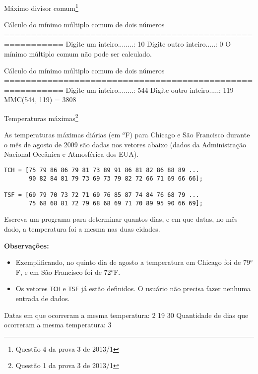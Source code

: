 \documentclass[11pt]{practice}
\begin{document}
\begin{task}[breakable]{Máximo divisor comum\footnote{Questão 4 da prova 3 de 2013/1}}{}
  \begin{runexample}
Cálculo do mínimo múltiplo comum de dois números
=========================================================
Digite um inteiro........: 10
Digite outro inteiro.....: 0
O mínimo múltiplo comum não pode ser calculado.
  \end{runexample}

  \begin{runexample}
Cálculo do mínimo múltiplo comum de dois números
=========================================================
Digite um inteiro........: 544
Digite outro inteiro.....: 119
MMC(544, 119) = 3808
  \end{runexample}

  \tcblower
  \solution
\end{task}


\begin{task}[breakable]{Temperaturas máximas\footnote{Questão 1 da prova 3 de 2013/1}}{}

  As temperaturas máximas diárias (em $^o$F) para Chicago e São
  Francisco durante o mês de agosto de 2009 são dadas nos vetores abaixo
  (dados da Administração Nacional Oceânica e Atmosférica dos EUA).

  \begin{verbatim}
TCH = [75 79 86 86 79 81 73 89 91 86 81 82 86 88 89 ...
       90 82 84 81 79 73 69 73 79 82 72 66 71 69 66 66];

TSF = [69 79 70 73 72 71 69 76 85 87 74 84 76 68 79 ...
       75 68 68 81 72 79 68 68 69 71 70 89 95 90 66 69];
  \end{verbatim}

  Escreva um programa para determinar quantos dias, e em que datas, no
  mês dado, a temperatura foi a mesma nas duas cidades.

  \textbf{Observações:}\\
  \begin{itemize}
    \item Exemplificando, no quinto dia de agosto a temperatura em
    Chicago foi de 79$^o$F, e em São Francisco foi de 72$^o$F.
    \item Os vetores \texttt{TCH} e \texttt{TSF} já estão definidos. O
    usuário não precisa fazer nenhuma entrada de dados.
  \end{itemize}

  \begin{runexample}
Datas em que ocorreram a mesma temperatura:  2 19 30
Quantidade de dias que ocorreram a mesma temperatura: 3
  \end{runexample}

  \tcblower
  \solution
\end{task}
\end{document}
